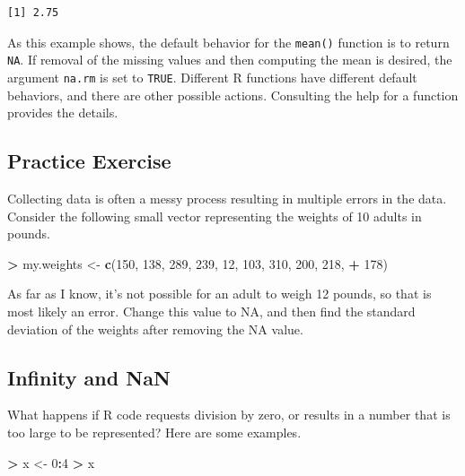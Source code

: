 \documentclass[]{krantz}
\makeatletter
\newenvironment{Shaded}{\begin{snugshade}}{\end{snugshade}}
\newcommand{\DecValTok}[1]{\textcolor[rgb]{0.06,0.06,0.06}{#1}}
\newcommand{\KeywordTok}[1]{\textcolor[rgb]{0.27,0.27,0.27}{\textbf{#1}}}
\newcommand{\NormalTok}[1]{#1}
\newcommand{\OperatorTok}[1]{\textcolor[rgb]{0.43,0.43,0.43}{\textbf{#1}}}
\newcommand{\StringTok}[1]{\textcolor[rgb]{0.5,0.5,0.5}{#1}}
\newenvironment{kframe}{%
\medskip{}
\setlength{\fboxsep}{.8em}
 \def\at@end@of@kframe{}%
 \ifinner\ifhmode%
  \def\at@end@of@kframe{\end{minipage}}%
  \begin{minipage}{\columnwidth}%
 \fi\fi%
 \def\FrameCommand##1{\hskip\@totalleftmargin \hskip-\fboxsep
 \colorbox{shadecolor}{##1}\hskip-\fboxsep
     \hskip-\linewidth \hskip-\@totalleftmargin \hskip\columnwidth}%
 \MakeFramed {\advance\hsize-\width
   \@totalleftmargin\z@ \linewidth\hsize
   \@setminipage}}%
 {\par\unskip\endMakeFramed%
 \at@end@of@kframe}
\renewenvironment{Shaded}{\begin{kframe}}{\end{kframe}}
\makeatother
\begin{document}
\begin{verbatim}
[1] 2.75
\end{verbatim}

As this example shows, the default behavior for the \texttt{mean()} function is to return \texttt{NA}. If removal of the missing values and then computing the mean is desired, the argument \texttt{na.rm} is set to \texttt{TRUE}. Different R functions have different default behaviors, and there are other possible actions. Consulting the help for a function provides the details.

\hypertarget{practice-exercise-2}{%
\subsection{Practice Exercise}\label{practice-exercise-2}}

Collecting data is often a messy process resulting in multiple errors in the data. Consider the following small vector representing the weights of 10 adults in pounds.

\begin{Shaded}
\begin{Highlighting}[]
\OperatorTok{>}\StringTok{ }\NormalTok{my.weights <-}\StringTok{ }\KeywordTok{c}\NormalTok{(}\DecValTok{150}\NormalTok{, }\DecValTok{138}\NormalTok{, }\DecValTok{289}\NormalTok{, }\DecValTok{239}\NormalTok{, }\DecValTok{12}\NormalTok{, }\DecValTok{103}\NormalTok{, }\DecValTok{310}\NormalTok{, }\DecValTok{200}\NormalTok{, }\DecValTok{218}\NormalTok{, }
\OperatorTok{+}\StringTok{   }\DecValTok{178}\NormalTok{)}
\end{Highlighting}
\end{Shaded}

As far as I know, it's not possible for an adult to weigh 12 pounds, so that is most likely an error. Change this value to NA, and then find the standard deviation of the weights after removing the NA value.

\hypertarget{infinity-and-nan}{%
\subsection{Infinity and NaN}\label{infinity-and-nan}}

What happens if R code requests division by zero, or results in a number that is too large to be represented? Here are some examples.

\begin{Shaded}
\begin{Highlighting}[]
\OperatorTok{>}\StringTok{ }\NormalTok{x <-}\StringTok{ }\DecValTok{0}\OperatorTok{:}\DecValTok{4}
\OperatorTok{>}\StringTok{ }\NormalTok{x}
\end{Highlighting}
\end{Shaded}
\end{document}
